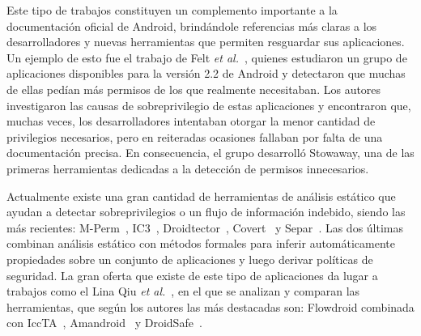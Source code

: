
Este tipo de trabajos constituyen un complemento importante a la documentación oficial de Android,
brindándole referencias más claras a los desarrolladores y nuevas herramientas que permiten
resguardar sus aplicaciones. Un ejemplo de esto fue el trabajo de Felt \textit{et al.}~\cite{felt},
quienes estudiaron un grupo de aplicaciones disponibles para la versión 2.2 de Android y detectaron
que muchas de ellas pedían más permisos de los que realmente necesitaban. Los autores investigaron
las causas de sobreprivilegio de estas aplicaciones y encontraron que, muchas veces, los
desarrolladores intentaban otorgar la menor cantidad de privilegios necesarios, pero en reiteradas
ocasiones fallaban por falta de una documentación precisa. En consecuencia, el grupo desarrolló
Stowaway, una de las primeras herramientas dedicadas a la detección de permisos innecesarios.

Actualmente existe una gran cantidad de herramientas de análisis estático que ayudan a detectar
sobreprivilegios o un flujo de información indebido, siendo las más recientes:
%
M-Perm~\cite{mperm},
%
IC3~\cite{ic3},
Droidtector~\cite{droidtector},
Covert~\cite{covert} y Separ~\cite{separ}.
Las dos últimas combinan análisis estático con métodos formales para inferir automáticamente
propiedades sobre un conjunto de aplicaciones y luego derivar políticas de seguridad. La gran oferta
que existe de este tipo de aplicaciones da lugar a trabajos como el Lina Qiu \textit{et
    al.}~\cite{qiu}, en el que se analizan y comparan las herramientas, que según los autores las más
destacadas son: Flowdroid combinada con IccTA~\cite{iccta}, Amandroid~\cite{amandroid} y
DroidSafe~\cite{droidsafe}.

